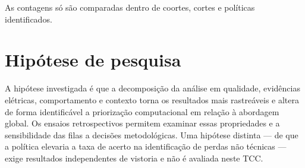As contagens só são comparadas dentro de coortes, cortes e políticas identificados.

\section{Hipótese de pesquisa}\label{hipuxf3tese-de-pesquisa}

A hipótese investigada é que a decomposição da análise em qualidade, evidências elétricas, comportamento e contexto torna os resultados mais rastreáveis e altera de forma identificável a priorização computacional em relação à abordagem global. Os ensaios retrospectivos permitem examinar essas propriedades e a sensibilidade das filas a decisões metodológicas. Uma hipótese distinta --- de que a política elevaria a taxa de acerto na identificação de perdas não técnicas --- exige resultados independentes de vistoria e não é avaliada neste TCC.
